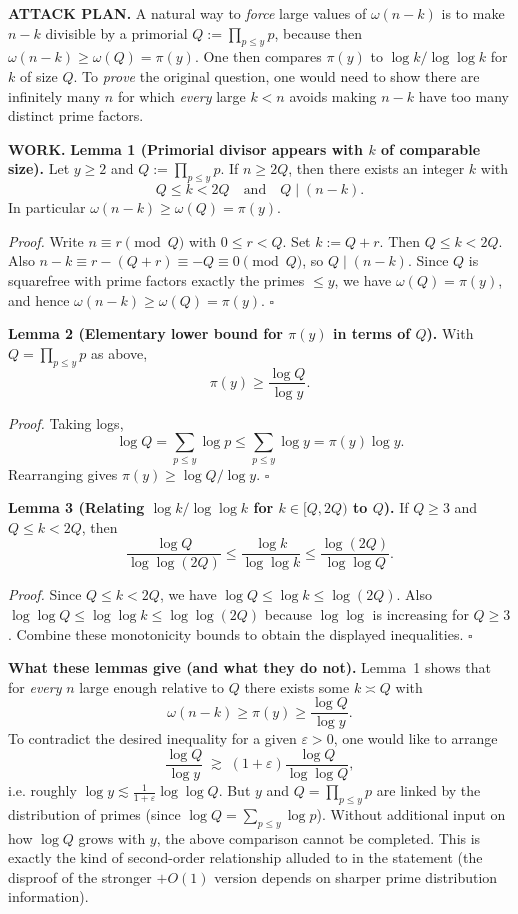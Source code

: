 \textbf{ATTACK PLAN.}
A natural way to \emph{force} large values of $\omega(n-k)$ is to make $n-k$ divisible by a primorial $Q:=\prod_{p\le y}p$, because then $\omega(n-k)\ge\omega(Q)=\pi(y)$. One then compares $\pi(y)$ to $\log k/\log\log k$ for $k$ of size $Q$.
To \emph{prove} the original question, one would need to show there are infinitely many $n$ for which \emph{every} large $k<n$ avoids making $n-k$ have too many distinct prime factors.

\textbf{WORK.}
\textbf{Lemma 1 (Primorial divisor appears with $k$ of comparable size).}
Let $y\ge2$ and $Q:=\prod_{p\le y}p$. If $n\ge 2Q$, then there exists an integer $k$ with
\[Q\le k <2Q\quad\text{and}\quad Q\mid (n-k).
\]
In particular $\omega(n-k)\ge \omega(Q)=\pi(y)$.

\emph{Proof.}
Write $n\equiv r\pmod Q$ with $0\le r<Q$.
Set $k:=Q+r$. Then $Q\le k<2Q$.
Also $n-k\equiv r-(Q+r)\equiv -Q\equiv 0\pmod Q$, so $Q\mid(n-k)$.
Since $Q$ is squarefree with prime factors exactly the primes $\le y$, we have $\omega(Q)=\pi(y)$, and hence $\omega(n-k)\ge\omega(Q)=\pi(y)$.
\hfill$\square$

\textbf{Lemma 2 (Elementary lower bound for $\pi(y)$ in terms of $Q$).}
With $Q=\prod_{p\le y}p$ as above,
\[\pi(y)\ge \frac{\log Q}{\log y}.
\]

\emph{Proof.}
Taking logs,
\[\log Q=\sum_{p\le y}\log p\le \sum_{p\le y}\log y=\pi(y)\log y.
\]
Rearranging gives $\pi(y)\ge \log Q/\log y$.
\hfill$\square$

\textbf{Lemma 3 (Relating $\log k/\log\log k$ for $k\in[Q,2Q)$ to $Q$).}
If $Q\ge 3$ and $Q\le k<2Q$, then
\[
\frac{\log Q}{\log\log(2Q)}\le \frac{\log k}{\log\log k}\le \frac{\log(2Q)}{\log\log Q}.
\]

\emph{Proof.}
Since $Q\le k<2Q$, we have $\log Q\le \log k\le \log(2Q)$.
Also $\log\log Q\le \log\log k\le \log\log(2Q)$ because $\log\log$ is increasing for $Q\ge 3$.
Combine these monotonicity bounds to obtain the displayed inequalities.
\hfill$\square$

\textbf{What these lemmas give (and what they do not).}
Lemma~1 shows that for \emph{every} $n$ large enough relative to $Q$ there exists some $k\asymp Q$ with
\[\omega(n-k)\ge\pi(y)\ge \frac{\log Q}{\log y}.
\]
To contradict the desired inequality for a given $\varepsilon>0$, one would like to arrange
\[\frac{\log Q}{\log y}\;\gtrsim\;(1+\varepsilon)\frac{\log Q}{\log\log Q},
\]
i.e. roughly $\log y\lesssim \frac{1}{1+\varepsilon}\log\log Q$.
But $y$ and $Q=\prod_{p\le y}p$ are linked by the distribution of primes (since $\log Q=\sum_{p\le y}\log p$). Without additional input on how $\log Q$ grows with $y$, the above comparison cannot be completed.
This is exactly the kind of second-order relationship alluded to in the statement (the disproof of the stronger $+O(1)$ version depends on sharper prime distribution information).

